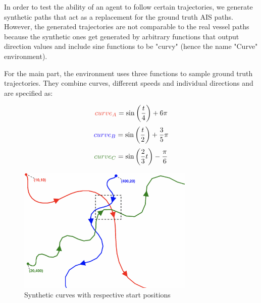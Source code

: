 In order to test the ability of an agent to follow certain trajectories, we generate synthetic paths that act as a replacement for the ground truth AIS paths. However, the generated trajectories are not comparable to the real vessel paths because the synthetic ones get generated by arbitrary functions that output direction values and include sine functions to be "curvy" (hence the name "Curve" environment).
\par
For the main part, the environment uses three functions to sample ground truth trajectories. They combine curves, different speeds and individual directions and are specified as:

\begin{equation}
\textcolor[RGB]{235,52,35}{curve_A} = \sin \left( \frac{t}{4} \right) + 6\pi
\end{equation}
\begin{equation}
\textcolor[RGB]{20,1,244}{curve_B} = \sin \left( \frac{t}{2} \right)+ \frac{3}{5}\pi
\end{equation}
\begin{equation}
\textcolor[RGB]{54,125,34}{curve_C} = \sin \left( \frac{2}{3} t \right) - \frac{\pi}{6}
\end{equation}

\begin{figure}[H]
    \centering
    \includegraphics[width=0.75\textwidth]{images/curves.png}
    \caption{Synthetic curves with respective start positions}
    \label{fig:syntheticCurves}
\end{figure}

